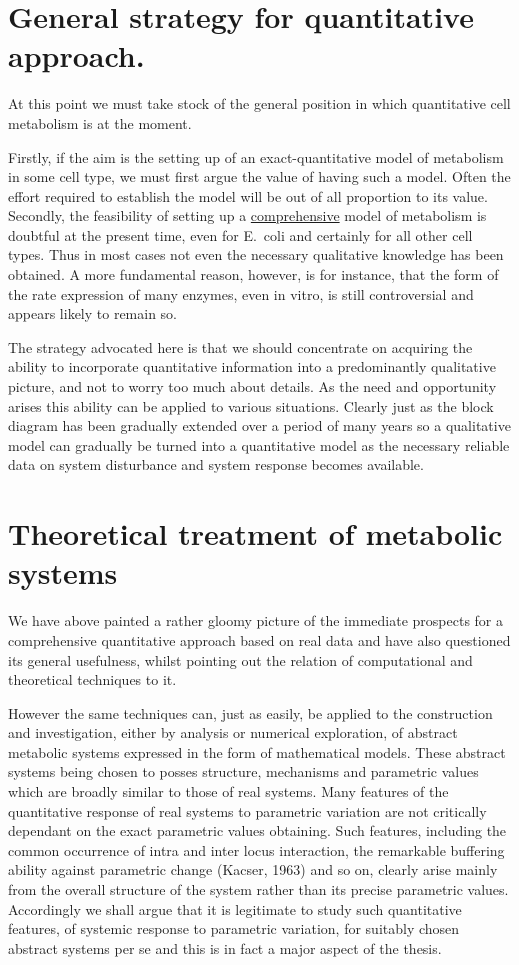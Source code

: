 \section{General strategy for quantitative approach.}

At this point we must take stock of the general position in which quantitative cell metabolism is at the moment.

Firstly, if the aim is the setting up of an exact-quantitative model of metabolism in some cell type, we must first argue the value of having such a model. Often the effort required to establish the model will be out of all proportion to its value. Secondly, the feasibility of setting up a \underline{comprehensive} model of metabolism is doubtful at the present time, even for E.\ coli and certainly for all other cell types. Thus in most cases not even the necessary qualitative knowledge has been obtained. A more fundamental reason, however, is for instance, that the form of the rate expression of many enzymes, even in vitro, is still controversial and appears likely to remain so.

The strategy advocated here is that we should concentrate on acquiring the ability to incorporate quantitative information into a predominantly qualitative picture, and not to worry too much about details. As the need and opportunity arises this ability can be applied to various situations. Clearly just as the block diagram has been gradually extended over a period of many years so a qualitative model can gradually be turned into a quantitative model as the necessary reliable data on system disturbance and system response becomes available.

\section{Theoretical treatment of metabolic systems}

We have above painted a rather gloomy picture of the immediate prospects for a comprehensive quantitative approach based on real data and have also questioned its general usefulness, whilst pointing out the relation of computational and theoretical techniques to it.

However the same techniques can, just as easily, be applied to the construction and investigation, either by analysis or numerical exploration, of abstract metabolic systems expressed in the form of mathematical models. These abstract systems being chosen to posses structure, mechanisms and parametric values which are broadly similar to those of real systems. Many features of the quantitative response of real systems to parametric variation are not critically dependant on the exact parametric values obtaining. Such features, including the common occurrence of intra and inter locus interaction, the remarkable buffering ability against parametric change (Kacser, 1963) and so on, clearly arise mainly from the overall structure of the system rather than its precise parametric values. Accordingly we shall argue that it is legitimate to study such quantitative features, of systemic response to parametric variation, for suitably chosen abstract systems per se and this is in fact a major aspect of the thesis.

